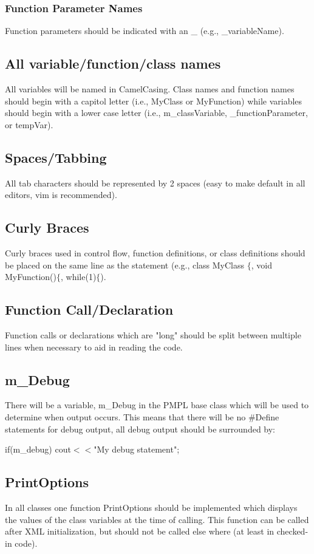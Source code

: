 \documentclass[12pt]{article}
\begin{document}
\subsubsection{Function Parameter Names}
Function parameters should be indicated with an \_ (e.g., \_variableName).

\subsection{All variable/function/class names}
All variables will be named in CamelCasing. Class names and function names should begin with a capitol letter (i.e.,
MyClass or MyFunction) while variables should begin with a lower case letter (i.e., m\_classVariable,
\_functionParameter, or tempVar).

\subsection{Spaces/Tabbing}
All tab characters should be represented by 2 spaces (easy to make default in all editors, vim is recommended).

\subsection{Curly Braces}
Curly braces used in control flow, function definitions, or class definitions should be placed on the same line as the
statement (e.g., class MyClass $\{$, void MyFunction()$\{$, while(1)$\{$).

\subsection{Function Call/Declaration}
Function calls or declarations which are "long" should be split between multiple lines when necessary to aid in reading
the code.

\subsection{m\_Debug}
There will be a variable, m\_Debug in the PMPL base class which will be used to determine when output occurs. This means
that there will be no \#Define statements for debug output, all debug output should be surrounded by:

if(m\_debug) cout$<<$"My debug statement";

\subsection{PrintOptions}
In all classes one function PrintOptions should be implemented which displays the values of the class variables at the
time of calling. This function can be called after XML initialization, but should not be called else where (at least in
checked-in code).
\end{document}
